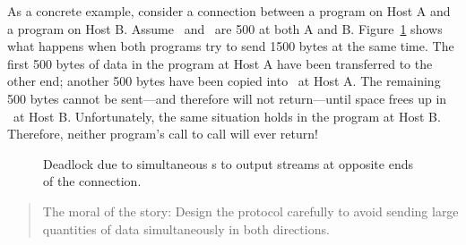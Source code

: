 As a concrete example, consider a connection between a program on Host
A and a program on Host B.  Assume \sqsize\ and \rqsize\ are 500
at both A and B.  Figure~\ref{fig:deadlock} shows what happens when
both programs try to send 1500 bytes at the same time.  The first 500
bytes of data in the program at Host A have been transferred to the
other end; another 500 bytes have been copied into \sque\ at
Host A.  The remaining 500 bytes cannot be sent---and therefore
 will not return---until
space frees up in \rque\ at Host B.  Unfortunately, the same
situation holds in the program at Host B.  Therefore, neither
program's call to  call will ever return!

\begin{figure}
\caption{\label{fig:deadlock}Deadlock due to simultaneous s
to output streams at opposite ends of the connection.}
\end{figure}

\begin{quote}
The moral of the story: Design the protocol carefully to avoid
sending large quantities of data simultaneously in both directions.
\end{quote}




